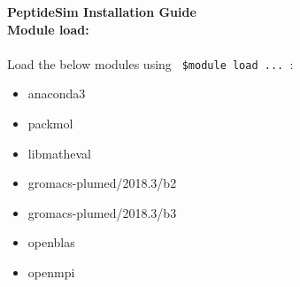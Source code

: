 \documentclass [12pt] {article}
\begin{document}
\noindent	\textbf{PeptideSim Installation Guide} \hfill		
	\onehalfspacing 
\\

\noindent	\textbf{Module load:} 
\\\\ \indent Load the below modules using {\color{blue} \texttt{ \$module load ... }}:
\begin{multicols}{3}
\begin{itemize}
\item anaconda3 
\item packmol
\item  libmatheval
\item gromacs-plumed/2018.3/b2
\item gromacs-plumed/2018.3/b3
\item openblas
\item openmpi 
\end{itemize}
\end{multicols}
\end{document}
